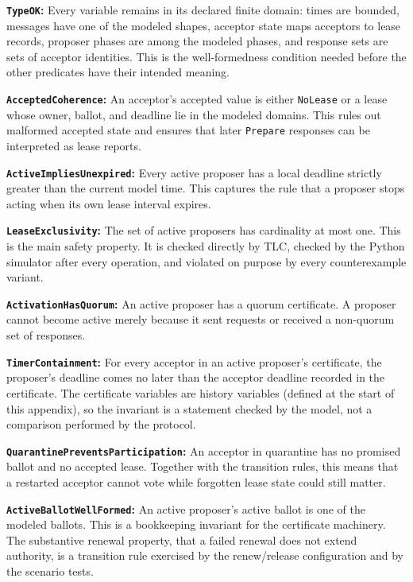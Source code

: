 \documentclass[final,5p,times,twocolumn,number]{elsarticle}
\newcommand{\code}[1]{\texttt{#1}}
\newcommand{\invitem}[1]{\smallskip\noindent\textbf{#1:} }
\begin{document}
\invitem{\code{TypeOK}}Every variable remains in its declared finite domain: times are bounded, messages have one of the modeled shapes, acceptor state maps acceptors to lease records, proposer phases are among the modeled phases, and response sets are sets of acceptor identities.  This is the well-formedness condition needed before the other predicates have their intended meaning.

\invitem{\code{AcceptedCoherence}}An acceptor's accepted value is either \code{NoLease} or a lease whose owner, ballot, and deadline lie in the modeled domains.  This rules out malformed accepted state and ensures that later \code{Prepare} responses can be interpreted as lease reports.

\invitem{\code{ActiveImpliesUnexpired}}Every active proposer has a local deadline strictly greater than the current model time.  This captures the rule that a proposer stops acting when its own lease interval expires.

\invitem{\code{LeaseExclusivity}}The set of active proposers has cardinality at most one.  This is the main safety property.  It is checked directly by TLC, checked by the Python simulator after every operation, and violated on purpose by every counterexample variant.

\invitem{\code{ActivationHasQuorum}}An active proposer has a quorum certificate.  A proposer cannot become active merely because it sent requests or received a non-quorum set of responses.

\invitem{\code{TimerContainment}}For every acceptor in an active proposer's certificate, the proposer's deadline comes no later than the acceptor deadline recorded in the certificate.  The certificate variables are history variables (defined at the start of this appendix), so the invariant is a statement checked by the model, not a comparison performed by the protocol.

\invitem{\code{QuarantinePreventsParticipation}}An acceptor in quarantine has no promised ballot and no accepted lease.  Together with the transition rules, this means that a restarted acceptor cannot vote while forgotten lease state could still matter.

\invitem{\code{ActiveBallotWellFormed}}An active proposer's active ballot is one of the modeled ballots.  This is a bookkeeping invariant for the certificate machinery.  The substantive renewal property, that a failed renewal does not extend authority, is a transition rule exercised by the renew/release configuration and by the scenario tests.
\end{document}
